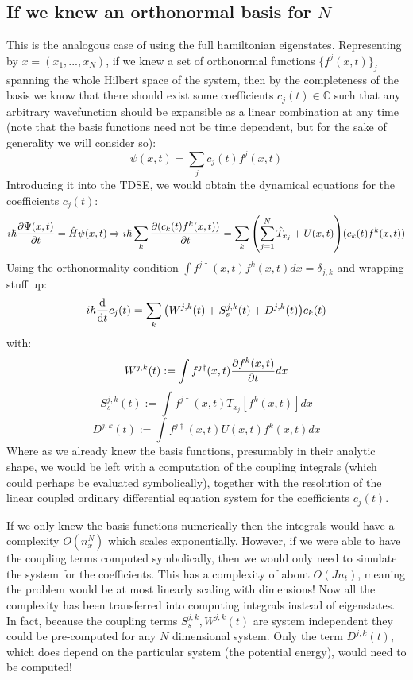 \documentclass[11pt, a4paper]{article} %
\newcommand{\C}{\mathbb{C}}
\begin{document}
\subsection{If we knew an orthonormal basis for $N$}
This is the analogous case of using the full hamiltonian eigenstates. Representing by $x=(x_1,...,x_N)$, if we knew a set of orthonormal functions $\{f^j(x,t)\}_j$ spanning the whole Hilbert space of the system, then by the completeness of the basis we know that there should exist some coefficients $c_j(t)\in \C$ such that any arbitrary wavefunction should be expansible as a linear combination at any time (note that the basis functions need not be time dependent, but for the sake of generality we will consider so):
\begin{equation}
\psi(x,t)=\sum_j c_j(t) f^j(x,t)
\end{equation}
Introducing it into the TDSE, we would obtain the dynamical equations for the coefficients $c_j(t)$:
\begin{equation}
i\hbar \pdv{\Psi(x,t)}{t}=\hat{H}\psi(x,t)\Rightarrow i\hbar \sum_k\pdv{(c_k(t)f^k(x,t))}{t}=\sum_k\qty(\sum_{j=1}^N \hat{T}_{x_j} + U(x, t))(c_k(t)f^k(x,t))
\end{equation}
Using the orthonormality condition $\int f^{j\dagger}(x,t)f^k(x,t)dx=\delta_{j,k}$ and wrapping stuff up:
\begin{equation}
i\hbar\dv{}{t}c_j(t)=\sum_k\qty(W^{j,k}(t)+S^{j,k}_s(t)+D^{j,k}(t))c_k(t)
\end{equation}
with:
\begin{equation}
W^{j,k}(t):=\int f^{j\dagger}(x,t) \pdv{f^k(x,t)}{t} dx
\end{equation}
\begin{equation}
S^{j,k}_s(t):=\int f^{j\dagger}(x,t) T_{x_j}[f^k(x,t)] dx
\end{equation}
\begin{equation}
D^{j,k}(t):=\int f^{j\dagger}(x,t) U(x,t)f^k(x,t) dx
\end{equation}
Where as we already knew the basis functions, presumably in their analytic shape, we would be left with a computation of the coupling integrals (which could perhaps be evaluated symbolically), together with the resolution of the linear coupled ordinary differential equation system for the coefficients $c_j(t)$.

If we only knew the basis functions numerically then the integrals would have a complexity $O(n_x^N)$ which scales exponentially. However, if we were able to have the coupling terms computed symbolically, then we would only need to simulate the system for the coefficients. This has a complexity of about $O(Jn_t)$, meaning the problem would be at most linearly scaling with dimensions! Now all the complexity has been transferred into computing integrals instead of eigenstates. In fact, because the coupling terms $S^{j,k}_s, W^{j,k}(t)$ are system independent they could be pre-computed for any $N$ dimensional system. Only the term $D^{j,k}(t)$, which does depend on the particular system (the potential energy), would need to be computed!
\end{document}
